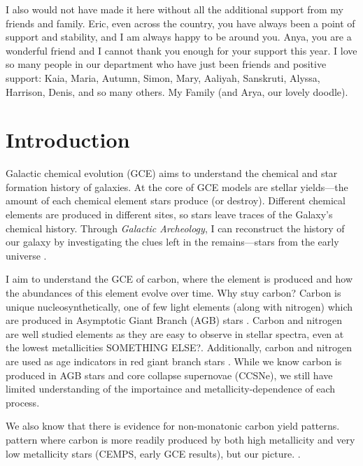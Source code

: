 \documentclass[12pt,oneside]{report}
\begin{document}
I also would not have made it here without all the additional support from my friends and family. Eric, even across the country, you have always been a point of support and stability, and I am always happy to be around you. Anya, you are a wonderful friend and I cannot thank you enough for your support this year. 
I love so many people in our department who have just been friends and positive support: Kaia, Maria, Autumn, Simon, Mary, Aaliyah, Sanskruti, Alyssa, Harrison, Denis, and so many others. 
My Family (and Arya, our lovely doodle).


\tableofcontents
\listoffigures
\listoftables
\newpage
{}



\chapter{Introduction}

Galactic chemical evolution (GCE) aims to understand the chemical and star formation history of galaxies. At the core of GCE models are stellar yields---the amount of each chemical element stars produce (or destroy). Different chemical elements are produced in different sites, so stars leave traces of the Galaxy's chemical history. Through \textit{Galactic Archeology}, I can reconstruct the history of our galaxy by investigating the clues left in the remains---stars from the early universe \citep{Weinberg+22, emily+19}.

I aim to understand the GCE of carbon, where the element is produced and how the abundances of this element evolve over time. Why stuy carbon? Carbon is unique nucleosynthetically, one of few light elements (along with nitrogen) which are produced in Asymptotic Giant Branch (AGB) stars \citep[for example,][]{jennifer19, KL14}. Carbon and nitrogen are well studied elements as they are easy to observe in stellar spectra, even at the lowest metallicities \citep{FN15} SOMETHING ELSE?. Additionally, carbon and nitrogen are used as age indicators in red giant branch stars \citep[e.g.][]{martig16, MG15, fiorenzo+21}.
While we know carbon is produced in AGB stars and core collapse supernovae (CCSNe), we still have limited understanding of the importaince and metallicity-dependence of each process.


We also know that there is evidence for non-monatonic carbon yield patterns. 
pattern where carbon is more readily produced by both high metallicity and very low metallicity stars (CEMPS, early GCE results), but our picture. \citep{FN15,cooke+17,berg+19}.
\end{document}
